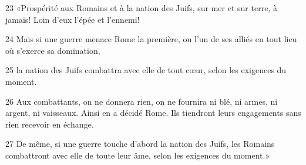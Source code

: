 23 «Prospérité aux Romains et à la nation des Juifs, sur mer et sur terre, à jamais! Loin d’eux l’épée et l’ennemi!

24 Mais si une guerre menace Rome la première, ou l’un de ses alliés en tout lieu où s’exerce sa domination,

25 la nation des Juifs combattra avec elle de tout cœur, selon les exigences du moment.

26 Aux combattants, on ne donnera rien, on ne fournira ni blé, ni armes, ni argent, ni vaisseaux. Ainsi en a décidé Rome. Ils tiendront leurs engagements sans rien recevoir en échange.

27 De même, si une guerre touche d’abord la nation des Juifs, les Romains combattront avec elle de toute leur âme, selon les exigences du moment.»